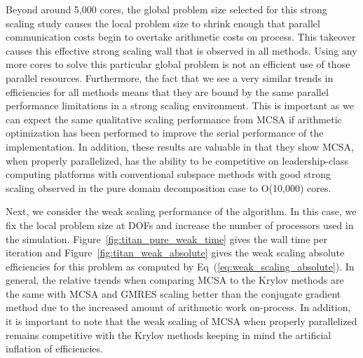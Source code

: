 Beyond around 5,000 cores, the global problem size selected for this
strong scaling study causes the local problem size to shrink enough
that parallel communication costs begin to overtake arithmetic costs
on process. This takeover causes this effective strong scaling wall
that is observed in all methods. Using any more cores to solve this
particular global problem is not an efficient use of those parallel
resources. Furthermore, the fact that we see a very similar trends in
efficiencies for all methods means that they are bound by the same
parallel performance limitations in a strong scaling environment. This
is important as we can expect the same qualitative scaling performance
from MCSA if arithmetic optimization has been performed to improve the
serial performance of the implementation. In addition, these results
are valuable in that they show MCSA, when properly parallelized, has
the ability to be competitive on leadership-class computing platforms
with conventional subspace methods with good strong scaling observed
in the pure domain decomposition case to O(10,000) cores.

Next, we consider the weak scaling performance of the algorithm. In
this case, we fix the local problem size at  DOFs and
increase the number of processors used in the
simulation. Figure~\ref{fig:titan_pure_weak_time} gives the wall
time per iteration and Figure~\ref{fig:titan_weak_absolute} gives the
weak scaling absolute efficiencies for this problem as computed by
Eq~(\ref{eq:weak_scaling_absolute}). In general, the relative trends
when comparing MCSA to the Krylov methods are the same with MCSA and
GMRES scaling better than the conjugate gradient method due to the
increased amount of arithmetic work on-process. In addition, it is
important to note that the weak scaling of MCSA when properly
parallelized remains competitive with the Krylov methods keeping in
mind the artificial inflation of efficiencies.

